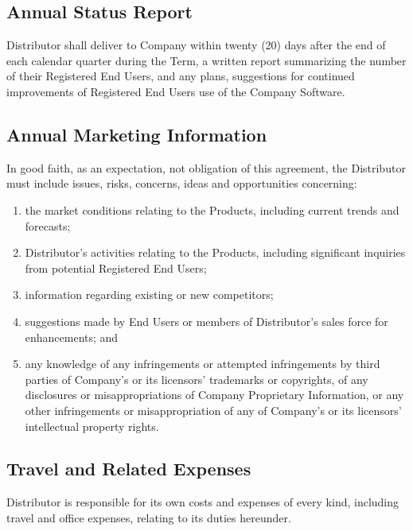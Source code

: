\documentclass[letterpaper,10pt,english]{sphinxmanual}
\begin{document}
\subsection{Annual Status Report}
\label{\detokenize{additionalresponsibilities2:annual-status-report}}
Distributor shall deliver to Company within twenty (20) days after the end of each calendar quarter during the Term, a written report summarizing the number of their Registered End Users, and any plans, suggestions for continued improvements of Registered End Users use of the Company Software.


\subsection{Annual Marketing Information}
\label{\detokenize{additionalresponsibilities2:annual-marketing-information}}
In good faith, as an expectation, not obligation of this agreement, the Distributor must include issues, risks, concerns, ideas and opportunities concerning:
\begin{enumerate}
\item {} 
the market conditions relating to the Products, including current trends and forecasts;

\item {} 
Distributor’s activities relating to the Products, including significant inquiries from potential Registered End Users;

\item {} 
information regarding existing or new competitors;

\item {} 
suggestions made by End Users or members of Distributor’s sales force for enhancements; and

\item {} 
any knowledge of any infringements or attempted infringements by third parties of Company’s or its licensors’ trademarks or copyrights, of any disclosures or misappropriations of Company Proprietary Information, or any other infringements or misappropriation of any of Company’s or its licensors’ intellectual property rights.

\end{enumerate}


\subsection{Travel and Related Expenses}
\label{\detokenize{additionalresponsibilities2:travel-and-related-expenses}}
Distributor is responsible for its own costs and expenses of every kind, including travel and office expenses, relating to its duties hereunder.
\end{document}
